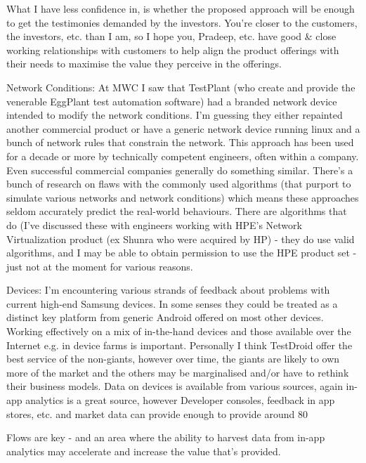 What I have less confidence in, is whether the proposed approach will be enough to get the testimonies demanded by the investors. You're closer to the customers, the investors, etc. than I am, so I hope you, Pradeep, etc. have good & close working relationships with customers to help align the product offerings with their needs to maximise the value they perceive in the offerings.

Network Conditions: At MWC I saw that TestPlant (who create and provide the venerable EggPlant test automation software) had a branded network device intended to modify the network conditions. I'm guessing they either repainted another commercial product or have a generic network device running linux and a bunch of network rules that constrain the network. This approach has been used for a decade or more by technically competent engineers, often within a company. Even successful commercial companies generally do something similar. There's a bunch of research on flaws with the commonly used algorithms (that purport to simulate various networks and network conditions) which means these approaches seldom accurately predict the real-world behaviours. There are algorithms that do (I've discussed these with engineers working with HPE's Network Virtualization product (ex Shunra who were acquired by HP) - they do use valid algorithms, and I may be able to obtain permission to use the HPE product set - just not at the moment for various reasons.

Devices: I'm encountering various strands of feedback about problems with current high-end Samsung devices. In some senses they could be treated as a distinct key platform from generic Android offered on most other devices. Working effectively on a mix of in-the-hand devices and those available over the Internet e.g. in device farms is important. Personally I think TestDroid offer the best service of the non-giants, however over time, the giants are likely to own more of the market and the others may be marginalised and/or have to rethink their business models. Data on devices is available from various sources, again in-app analytics is a great source, however Developer consoles, feedback in app stores, etc. and market data can provide enough to provide around 80%

Flows are key - and an area where the ability to harvest data from in-app analytics may accelerate and increase the value that's provided.

